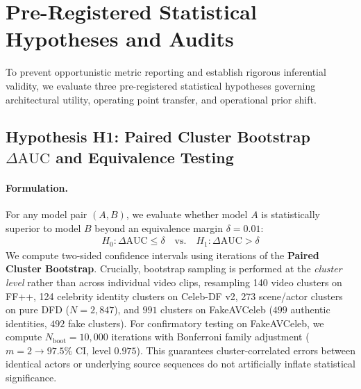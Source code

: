 \section{Pre-Registered Statistical Hypotheses and Audits}
\label{sec:stats}

To prevent opportunistic metric reporting and establish rigorous inferential validity, we evaluate three pre-registered statistical hypotheses governing architectural utility, operating point transfer, and operational prior shift.

\subsection{Hypothesis H1: Paired Cluster Bootstrap $\Delta\text{AUC}$ and Equivalence Testing}
\paragraph{Formulation.}
For any model pair $(A, B)$, we evaluate whether model $A$ is statistically superior to model $B$ beyond an equivalence margin $\delta = 0.01$:
\begin{align}
H_0: \Delta\text{AUC} \le \delta \quad \text{vs.} \quad H_1: \Delta\text{AUC} > \delta
\end{align}
We compute two-sided confidence intervals using iterations of the \textbf{Paired Cluster Bootstrap}. Crucially, bootstrap sampling is performed at the \emph{cluster level} rather than across individual video clips, resampling 140 video clusters on FF++, 124 celebrity identity clusters on Celeb-DF v2, 273 scene/actor clusters on pure DFD ($N=2{,}847$), and $991$ clusters on FakeAVCeleb ($499$ authentic identities, $492$ fake clusters). For confirmatory testing on FakeAVCeleb, we compute $N_{\text{boot}} = 10{,}000$ iterations with Bonferroni family adjustment ($m=2 \rightarrow 97.5\%$ CI, level $0.975$). This guarantees cluster-correlated errors between identical actors or underlying source sequences do not artificially inflate statistical significance.

